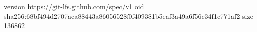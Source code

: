 version https://git-lfs.github.com/spec/v1
oid sha256:68bf494d2707aca88443a86056528f0f409381b5eaf3a49a6f56c34f1c771af2
size 136862
